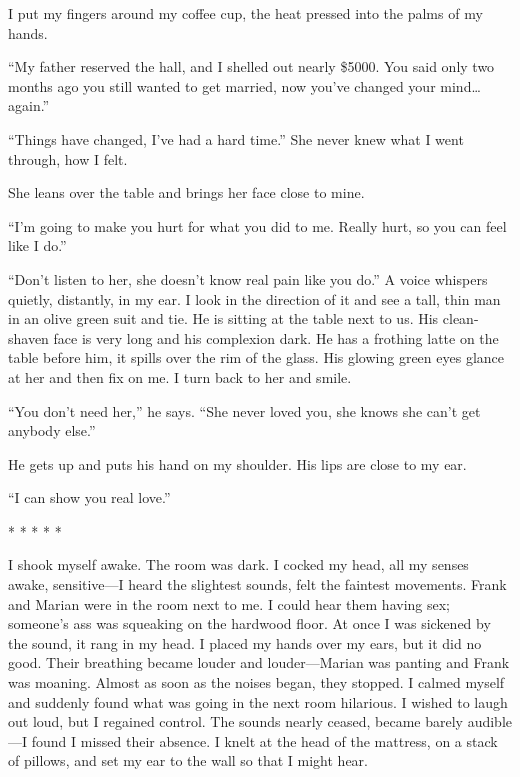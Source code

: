I put my fingers around my coffee cup, the heat pressed into the palms
of my hands.

``My father reserved the hall, and I shelled out nearly \$5000. You said
only two months ago you still wanted to get married, now you've changed
your mind\ldots again.''

``Things have changed, I've had a hard time.'' She never knew what I
went through, how I felt.

She leans over the table and brings her face close to mine.

``I'm going to make you hurt for what you did to me. Really hurt, so you
can feel like I do.''

``Don't listen to her, she doesn't know real pain like you do.'' A voice
whispers quietly, distantly, in my ear. I look in the direction of it
and see a tall, thin man in an olive green suit and tie. He is sitting
at the table next to us. His clean-shaven face is very long and his
complexion dark. He has a frothing latte on the table before him, it
spills over the rim of the glass. His glowing green eyes glance at her
and then fix on me. I turn back to her and smile.

``You don't need her,'' he says. ``She never loved you, she knows she
can't get anybody else.''

He gets up and puts his hand on my shoulder. His lips are close to my
ear.

``I can show you real love.''

* * * * *

I shook myself awake. The room was dark. I cocked my head, all my senses
awake, sensitive---I heard the slightest sounds, felt the faintest
movements. Frank and Marian were in the room next to me. I could hear
them having sex; someone's ass was squeaking on the hardwood floor. At
once I was sickened by the sound, it rang in my head. I placed my hands
over my ears, but it did no good. Their breathing became louder and
louder---Marian was panting and Frank was moaning. Almost as soon as the
noises began, they stopped. I calmed myself and suddenly found what was
going in the next room hilarious. I wished to laugh out loud, but I
regained control. The sounds nearly ceased, became barely audible---I
found I missed their absence. I knelt at the head of the mattress, on a
stack of pillows, and set my ear to the wall so that I might hear.

